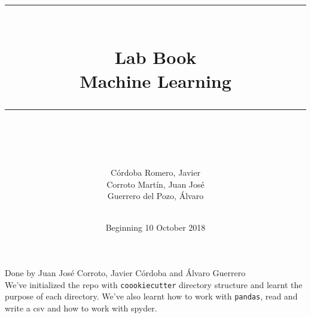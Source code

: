 \documentclass[idxtotoc,hyperref,openany]{labbook} %
\newcommand{\HRule}{\rule{\linewidth}{0.5mm}} %
\begin{document}

\frontmatter %
\title{
\begin{center}
\HRule \\[0.4cm]
{\Huge \bfseries Lab Book \\[0.5cm] \Large Machine Learning}\\[0.4cm] %
\HRule \\[1.5cm]
\end{center}
}
\author{\Huge C\'ordoba Romero, Javier \\ \Huge Corroto Mart\'in, Juan Jos\'e \\ \Huge Guerrero del Pozo, \'Alvaro \\ \\[2cm]} %
\date{Beginning 10 October 2018} %
\maketitle

\tableofcontents

\mainmatter %











Done by Juan Jos\'e Corroto, Javier C\'ordoba and \'Alvaro Guerrero\\

We've initialized the repo with \texttt{coookiecutter} directory structure and learnt the purpose of each directory.
We've also learnt how to work with \texttt{pandas}, read and write a csv and how to work with spyder.
\end{document}
